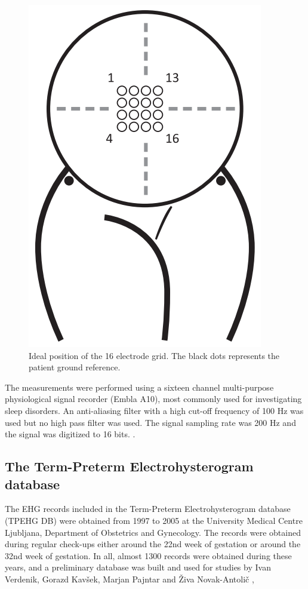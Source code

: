 \documentclass[bioengineering,article,submit,moreauthors,pdftex,10pt,a4paper]{mdpi}
\begin{document}
 \begin{figure}[H]
 	\caption{\label{abd_elec} Ideal position of the 16 electrode grid. The black dots represents the patient ground reference.}
 	\begin{center}
 		\includegraphics[scale=0.40]{imagens/abd_elec.png} 		
 	\end{center}
 \end{figure}

The measurements were performed using a sixteen channel multi-purpose physiological signal
recorder (Embla A10), most commonly used for investigating sleep disorders. An anti-aliasing filter with
a high cut-off frequency of 100 Hz was used but no high pass filter was used. The signal sampling rate was 200 Hz and the signal was digitized to 16 bits.  \cite{ref-islddatabase}.

\subsection{The Term-Preterm Electrohysterogram database}

The EHG records included in the Term-Preterm Electrohysterogram database (TPEHG DB) were obtained from 1997 to 2005 at the University Medical Centre Ljubljana, Department of Obstetrics and Gynecology. The records were obtained during regular check-ups either around the 22nd week of gestation or around the 32nd week of gestation. In all, almost 1300 records were obtained during these years, and a preliminary database was built and used for studies by Ivan Verdenik, Gorazd Kavšek, Marjan Pajntar and Živa Novak-Antolič \cite{ref-verdenik},\cite{ref-kavsek}
\end{document}
